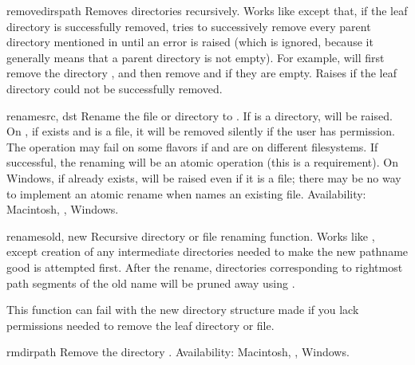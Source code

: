 \begin{funcdesc}{removedirs}{path}
Removes directories recursively.  Works like
 except that, if the leaf directory is
successfully removed,  
tries to successively remove every parent directory mentioned in 
 until an error is raised (which is ignored, because
it generally means that a parent directory is not empty).
For example,  will first remove
the directory , and then remove 
and  if they are empty.
Raises  if the leaf directory could not be 
successfully removed.
\end{funcdesc}

\begin{funcdesc}{rename}{src, dst}
Rename the file or directory  to .  If  is
a directory,  will be raised.  On \UNIX, if
 exists and is a file, it will be removed silently if the
user has permission.  The operation may fail on some \UNIX{} flavors
if  and  are on different filesystems.  If
successful, the renaming will be an atomic operation (this is a
\POSIX{} requirement).  On Windows, if  already exists,
 will be raised even if it is a file; there may be
no way to implement an atomic rename when  names an existing
file.
Availability: Macintosh, \UNIX, Windows.
\end{funcdesc}

\begin{funcdesc}{renames}{old, new}
Recursive directory or file renaming function.
Works like , except creation of any intermediate
directories needed to make the new pathname good is attempted first.
After the rename, directories corresponding to rightmost path segments
of the old name will be pruned away using .

\begin{notice}
This function can fail with the new directory structure made if
you lack permissions needed to remove the leaf directory or file.
\end{notice}
\end{funcdesc}

\begin{funcdesc}{rmdir}{path}
Remove the directory .
Availability: Macintosh, \UNIX, Windows.
\end{funcdesc}

